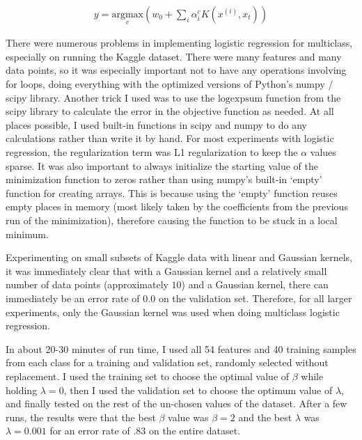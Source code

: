 \documentclass[10pt]{article}
\begin{document}
\begin{subequations}
	\begin{align}
		y = \underset{c}{\text{argmax}} \left(w_0 + \sum_i \alpha^c_i K(x^{(i)}, x_t)\right)
	\end{align}
	\label{eq:multiclass-lr}
\end{subequations}

There were numerous problems in implementing logistic regression for multiclass, especially on running the Kaggle dataset. There were many features and many data points, so it was especially important not to have any operations involving for loops, doing everything with the optimized versions of Python's numpy / scipy library. Another trick I used was to use the $\text{logexpsum}$ function from the scipy library to calculate the error in the objective function as needed. At all places possible, I used built-in functions in scipy and numpy to do any calculations rather than write it by hand. For most experiments with logistic regression, the regularization term was L1 regularization to keep the $\alpha$ values sparse. It was also important to always initialize the starting value of the minimization function to zeros rather than using numpy's built-in `empty' function for creating arrays. This is because using the `empty' function reuses empty places in memory (most likely taken by the coefficients from the previous run of the minimization), therefore causing the function to be stuck in a local minimum.

Experimenting on small subsets of Kaggle data with linear and Gaussian kernels, it was immediately clear that with a Gaussian kernel and a relatively small number of data points (approximately $10$) and a Gaussian kernel, there can immediately be an error rate of $0.0$ on the validation set. Therefore, for all larger experiments, only the Gaussian kernel was used when doing multiclass logistic regression.

In about 20-30 minutes of run time, I used all 54 features and 40 training samples from each class for a training and validation set, randomly selected without replacement. I used the training set to choose the optimal value of $\beta$ while holding $\lambda = 0$, then I used the validation set to choose the optimum value of $\lambda$, and finally tested on the rest of the un-chosen values of the dataset. After a few runs, the results were that the best $\beta$ value was $\beta = 2$ and the best $\lambda$ was $\lambda = 0.001$ for an error rate of $.83$ on the entire dataset.
\end{document}
